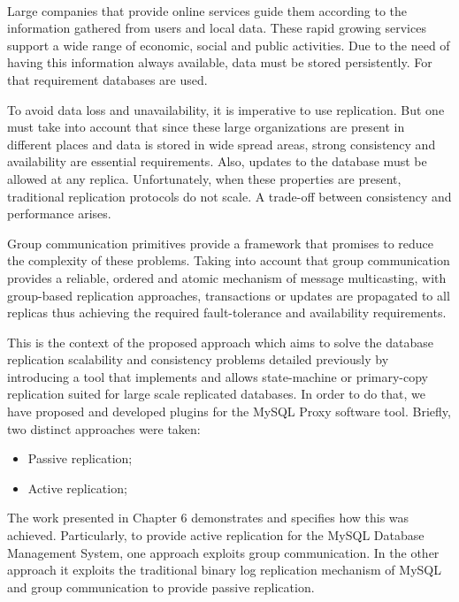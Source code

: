 \paragraph{}

Large companies that provide online services guide them according to the information gathered from users and local data. These rapid growing services support a wide range of economic, social and public activities. Due to the need of having this information always available, data must be stored persistently. For that requirement databases are used. 
 
To avoid data loss and unavailability, it is imperative to use replication. But one must take into account that since these large organizations are present in different places and data is stored in wide spread areas, strong consistency and availability are essential requirements. Also, updates to the database must be allowed at any replica. Unfortunately, when these properties are present, traditional replication protocols do not scale. A trade-off between consistency and performance arises.

Group communication primitives provide a framework that promises to reduce the complexity of these problems. Taking into account that group communication provides a reliable, ordered and atomic mechanism of message multicasting, with group-based replication approaches, transactions or updates are propagated to all replicas thus achieving the required fault-tolerance and availability requirements. 

This is the context of the proposed approach which aims to solve the database replication scalability and consistency problems detailed previously by introducing a tool that implements and allows state-machine or primary-copy replication suited for large scale replicated databases. In order to do that, we have proposed and developed plugins for the MySQL Proxy software tool. Briefly, two distinct approaches were taken:

\begin{itemize}
	\item Passive replication;
	\item Active replication;
\end{itemize}

The work presented in Chapter 6 demonstrates and specifies how this was achieved. Particularly, to provide active replication for the MySQL Database Management System, one approach exploits group communication. In the other approach it exploits the traditional binary log replication mechanism of MySQL and group communication to provide passive replication. 

